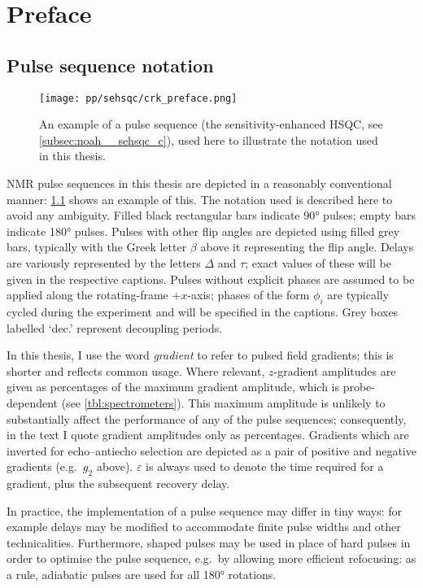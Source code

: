 \chapter{Preface}

\section*{Pulse sequence notation}

\begin{figure}[ht]
    \centering
    \texttt{[image: pp/sehsqc/crk\_preface.png]}%
    \caption[Example pulse sequence to illustrate notation]{An example of a pulse sequence (the sensitivity-enhanced HSQC, see \cref{subsec:noah__sehsqc_c}), used here to illustrate the notation used in this thesis.}
    \label{fig:preface_sehsqc}
\end{figure}

NMR pulse sequences in this thesis are depicted in a reasonably conventional manner: \cref{fig:preface_sehsqc} shows an example of this.
The notation used is described here to avoid any ambiguity.
Filled black rectangular bars indicate \ang{90} pulses; empty bars indicate \ang{180} pulses.
Pulses with other flip angles are depicted using filled grey bars, typically with the Greek letter $\beta$ above it representing the flip angle.
Delays are variously represented by the letters $\Delta$ and $\tau$; exact values of these will be given in the respective captions.
Pulses without explicit phases are assumed to be applied along the rotating-frame $+x$-axis; phases of the form $\phi_i$ are typically cycled during the experiment and will be specified in the captions.
Grey boxes labelled `dec.' represent decoupling periods.

In this thesis, I use the word \textit{gradient} to refer to pulsed field gradients; this is shorter and reflects common usage.
Where relevant, $z$-gradient amplitudes are given as percentages of the maximum gradient amplitude, which is probe-dependent (see \cref{tbl:spectrometers}).
This maximum amplitude is unlikely to substantially affect the performance of any of the pulse sequences; consequently, in the text I quote gradient amplitudes only as percentages.
Gradients which are inverted for echo--antiecho selection are depicted as a pair of positive and negative gradients (e.g.\ $g_2$ above).
$\varepsilon$ is always used to denote the time required for a gradient, plus the subsequent recovery delay.

In practice, the implementation of a pulse sequence may differ in tiny ways: for example delays may be modified to accommodate finite pulse widths and other technicalities.
Furthermore, shaped pulses may be used in place of hard pulses in order to optimise the pulse sequence, e.g.\ by allowing more efficient refocusing: as a rule, adiabatic pulses are used for all \carbon{} \ang{180} rotations.

